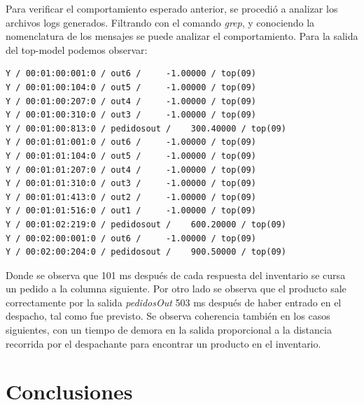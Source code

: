 \documentclass[10pt]{article}
\begin{document}
Para verificar el comportamiento esperado anterior, se procedió a analizar los archivos logs generados. Filtrando con el comando \textit{grep}, y conociendo la nomenclatura de los mensajes se puede analizar el comportamiento.
Para la salida del top-model podemos observar:

\begin{minipage}{1\textwidth}
	\centering
	\begin{lstlisting}
Y / 00:01:00:001:0 / out6 /     -1.00000 / top(09)
Y / 00:01:00:104:0 / out5 /     -1.00000 / top(09)
Y / 00:01:00:207:0 / out4 /     -1.00000 / top(09)
Y / 00:01:00:310:0 / out3 /     -1.00000 / top(09)
Y / 00:01:00:813:0 / pedidosout /    300.40000 / top(09)
Y / 00:01:01:001:0 / out6 /     -1.00000 / top(09)
Y / 00:01:01:104:0 / out5 /     -1.00000 / top(09)
Y / 00:01:01:207:0 / out4 /     -1.00000 / top(09)
Y / 00:01:01:310:0 / out3 /     -1.00000 / top(09)
Y / 00:01:01:413:0 / out2 /     -1.00000 / top(09)
Y / 00:01:01:516:0 / out1 /     -1.00000 / top(09)
Y / 00:01:02:219:0 / pedidosout /    600.20000 / top(09)
Y / 00:02:00:001:0 / out6 /     -1.00000 / top(09)
Y / 00:02:00:204:0 / pedidosout /    900.50000 / top(09)
	\end{lstlisting}	
\end{minipage}

Donde se observa que 101 ms después de cada respuesta del inventario se cursa un pedido a la columna siguiente. Por otro lado se observa que el producto sale correctamente por la salida \textit{pedidosOut} 503 ms después de haber entrado en el despacho, tal como fue previsto. Se observa coherencia también en los casos siguientes, con un tiempo de demora en la salida proporcional a la distancia recorrida por el despachante para encontrar un producto en el inventario.





\section{Conclusiones}
\end{document}
